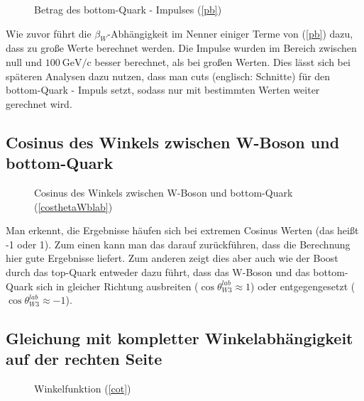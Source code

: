 \documentclass[
a4paper,                                %
twoside,                                %
BCOR1.4cm,                      %
ngerman,                                %
10pt,                           %
headings=normal,                %
headsepline,                    %
clearplainpage, %
final,                                  %
div=14,
parskip=full
]{scrbook}
\begin{document}
\begin{figure}[h]
    \caption{Betrag des bottom-Quark - Impulses (\ref{pb})}
\end{figure}

Wie zuvor f\"uhrt die $ \beta_{W} $-Abh\"angigkeit im Nenner einiger Terme von (\ref{pb}) dazu, dass zu gro\ss e Werte berechnet werden. Die Impulse wurden im Bereich zwischen null und $ 100\ \text{GeV}\text{/c} $ besser berechnet, als bei gro\ss en Werten. Dies l\"asst sich bei sp\"ateren Analysen dazu nutzen, dass man cuts (englisch: Schnitte) f\"ur den bottom-Quark - Impuls setzt, sodass nur mit bestimmten Werten weiter gerechnet wird.

\subsection{Cosinus des Winkels zwischen W-Boson und bottom-Quark}

\begin{figure}[h]
    \caption{Cosinus des Winkels zwischen W-Boson und bottom-Quark (\ref{costhetaWblab})}
\end{figure}

Man erkennt, die Ergebnisse  h\"aufen sich bei extremen Cosinus Werten (das hei\ss t -1 oder 1). Zum einen kann man das darauf zur\"uckf\"uhren, dass die Berechnung hier gute Ergebnisse liefert. Zum anderen zeigt dies aber auch wie der Boost durch das top-Quark entweder dazu f\"uhrt, dass das W-Boson und das bottom-Quark sich in gleicher Richtung ausbreiten ($ \cos \theta_{W3}^{lab} \approx 1 $) oder entgegengesetzt ($ \cos \theta_{W3}^{lab} \approx -1 $).

\subsection{Gleichung mit kompletter Winkelabh\"angigkeit auf der rechten Seite}

\begin{figure}[h]
    \caption{Winkelfunktion (\ref{cot})}
\end{figure}
\end{document}
